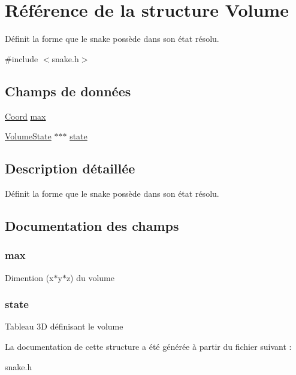 \hypertarget{struct_volume}{\section{Référence de la structure Volume}
\label{struct_volume}
}


Définit la forme que le snake possède dans son état résolu.  




{\ttfamily \#include $<$snake.\-h$>$}

\subsection*{Champs de données}
\begin{DoxyCompactItemize}
\item 
\hyperlink{struct_coord}{Coord} \hyperlink{struct_volume_aa83862769f78fffb512bc9283007ef67}{max}
\item 
\hyperlink{group___snake_gafe6214172a8f4085f7b16ce6523dcf7f}{Volume\-State} $\ast$$\ast$$\ast$ \hyperlink{struct_volume_adc6e5733fc3c22f0a7b2914188c49c90}{state}
\end{DoxyCompactItemize}


\subsection{Description détaillée}
Définit la forme que le snake possède dans son état résolu. 

\subsection{Documentation des champs}
\hypertarget{struct_volume_aa83862769f78fffb512bc9283007ef67}{
\subsubsection[{max}]{\setlength{\rightskip}{0pt plus 5cm}max}}\label{struct_volume_aa83862769f78fffb512bc9283007ef67}
Dimention (x$\ast$y$\ast$z) du volume \hypertarget{struct_volume_adc6e5733fc3c22f0a7b2914188c49c90}{
\subsubsection[{state}]{\setlength{\rightskip}{0pt plus 5cm}state}}\label{struct_volume_adc6e5733fc3c22f0a7b2914188c49c90}
Tableau 3\-D définisant le volume 

La documentation de cette structure a été générée à partir du fichier suivant \-:\begin{DoxyCompactItemize}
\item 
snake.\-h\end{DoxyCompactItemize}
